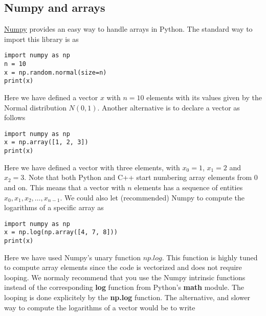 \documentclass[%
oneside,                 %
final,                   %
10pt]{article}
\begin{document}
\subsection*{Numpy and arrays}
\href{{http://www.numpy.org/}}{Numpy} provides an easy way to handle arrays in Python. The standard way to import this library is as
\begin{verbatim}
import numpy as np
n = 10
x = np.random.normal(size=n)
print(x)
\end{verbatim}
Here we have defined a vector $x$ with $n=10$ elements with its values given by the Normal distribution $N(0,1)$.
Another alternative is to declare a vector as follows
\begin{verbatim}
import numpy as np
x = np.array([1, 2, 3])
print(x)
\end{verbatim}
Here we have defined a vector with three elements, with $x_0=1$, $x_1=2$ and $x_2=3$. Note that both Python and C++
start numbering array elements from $0$ and on. This means that a vector with $n$ elements has a sequence of entities $x_0, x_1, x_2, \dots, x_{n-1}$. We could also let (recommended) Numpy to compute the logarithms of a specific array as
\begin{verbatim}
import numpy as np
x = np.log(np.array([4, 7, 8]))
print(x)
\end{verbatim}

Here we have used Numpy's unary function $np.log$. This function is
highly tuned to compute array elements since the code is vectorized
and does not require looping. We normaly recommend that you use the
Numpy intrinsic functions instead of the corresponding \textbf{log} function
from Python's \textbf{math} module. The looping is done explicitely by the
\textbf{np.log} function. The alternative, and slower way to compute the
logarithms of a vector would be to write
\end{document}

